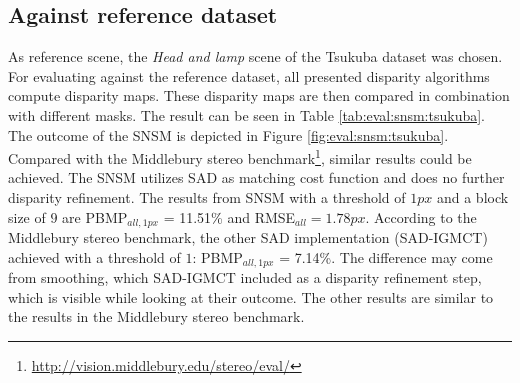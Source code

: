 \subsection{Against reference dataset}

As reference scene, the \textit{Head and lamp} scene of the Tsukuba dataset was chosen.
For evaluating against the reference dataset, all presented disparity algorithms compute disparity maps.
These disparity maps are then compared in combination with different masks.
The result can be seen in Table \ref{tab:eval:snsm:tsukuba}.
The outcome of the SNSM is depicted in Figure \ref{fig:eval:snsm:tsukuba}.
Compared with the Middlebury stereo benchmark\footnote{\url{http://vision.middlebury.edu/stereo/eval/}}, similar results could be achieved.
\newline\newline\noindent The SNSM utilizes SAD as matching cost function and does no further disparity refinement.
The results from SNSM with a threshold of $1px$ and a block size of $9$ are PBMP$_{all,1px}$ = 11.51\% and RMSE$_{all} = 1.78px$.
According to the Middlebury stereo benchmark, the other SAD implementation (SAD-IGMCT) \citep{ambrosch2010accurate} achieved with a threshold of $1$: PBMP$_{all,1px}$ = 7.14\%.
The difference may come from smoothing, which SAD-IGMCT included as a disparity refinement step, which is visible while looking at their outcome.
The other results are similar to the results in the Middlebury stereo benchmark.

